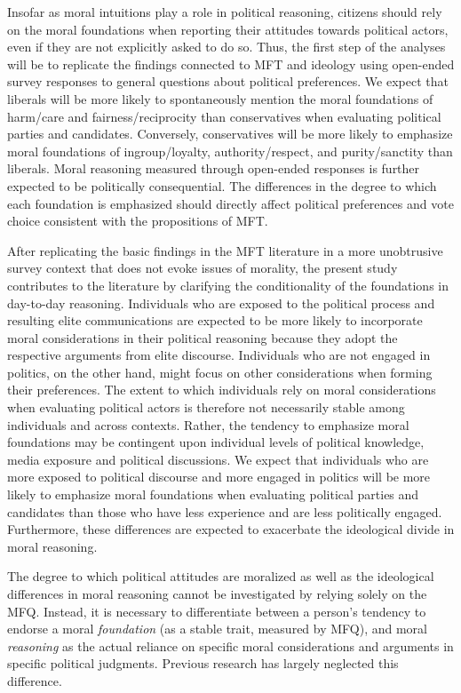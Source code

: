 \documentclass[12pt]{article}
\begin{document}
Insofar as moral intuitions play a role in political reasoning, citizens should rely on the moral foundations when reporting their attitudes towards political actors, even if they are not explicitly asked to do so. Thus, the first step of the analyses will be to replicate the findings connected to MFT and ideology using open-ended survey responses to general questions about political preferences. We expect that liberals will be more likely to spontaneously mention the moral foundations of harm/care and fairness/reciprocity than conservatives when evaluating political parties and candidates. Conversely, conservatives will be more likely to emphasize moral foundations of ingroup/loyalty, authority/respect, and purity/sanctity than liberals. Moral reasoning measured through open-ended responses is further expected to be politically consequential. The differences in the degree to which each foundation is emphasized should directly affect political preferences and vote choice consistent with the propositions of MFT.

After replicating the basic findings in the MFT literature in a more unobtrusive survey context that does not evoke issues of morality, the present study contributes to the literature by clarifying the conditionality of the foundations in day-to-day reasoning. Individuals who are exposed to the political process and resulting elite communications are expected to be more likely to incorporate moral considerations in their political reasoning because they adopt the respective arguments from elite discourse. Individuals who are not engaged in politics, on the other hand, might focus on other considerations when forming their preferences. The extent to which individuals rely on moral considerations when evaluating political actors is therefore not necessarily stable among individuals and across contexts. Rather, the tendency to emphasize moral foundations may be contingent upon individual levels of political knowledge, media exposure and political discussions. We expect that individuals who are more exposed to political discourse and more engaged in politics will be more likely to emphasize moral foundations when evaluating political parties and candidates than those who have less experience and are less politically engaged. Furthermore, these differences are expected to exacerbate the ideological divide in moral reasoning.

The degree to which political attitudes are moralized as well as the ideological differences in moral reasoning cannot be investigated by relying solely on the MFQ. Instead, it is necessary to differentiate between a person's tendency to endorse a moral \textit{foundation} (as a stable trait, measured by MFQ), and moral \textit{reasoning} as the actual reliance on specific moral considerations and arguments in specific political judgments. Previous research has largely neglected this difference.
\end{document}
